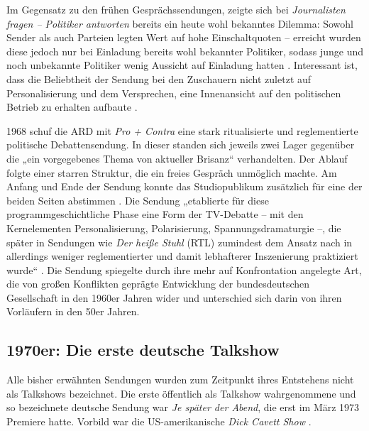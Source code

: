 Im Gegensatz zu den frühen Gesprächssendungen, zeigte sich bei \textit{Journalisten fragen – Politiker antworten} bereits ein heute wohl bekanntes Dilemma: Sowohl Sender als auch Parteien legten Wert auf hohe Einschaltquoten – erreicht wurden diese jedoch nur bei Einladung bereits wohl bekannter Politiker, sodass junge und noch unbekannte Politiker wenig Aussicht auf Einladung hatten \parencite[181]{kellerGeschichteTalkshowDeutschland2009}. Interessant ist, dass die Beliebtheit der Sendung bei den Zuschauern nicht zuletzt auf Personalisierung und dem Versprechen, eine Innenansicht auf den politischen Betrieb zu erhalten aufbaute \parencite[183]{kellerGeschichteTalkshowDeutschland2009}.

1968 schuf die ARD mit \textit{Pro + Contra} eine stark ritualisierte und reglementierte politische Debattensendung. In dieser standen sich jeweils zwei Lager gegenüber die „ein vorgegebenes Thema von aktueller Brisanz“ \parencite[169]{kellerGeschichteTalkshowDeutschland2009} verhandelten. Der Ablauf folgte einer starren Struktur, die ein freies Gespräch unmöglich machte. Am Anfang und Ende der Sendung konnte das Studiopublikum zusätzlich für eine der beiden Seiten abstimmen \parencite[169ff.]{kellerGeschichteTalkshowDeutschland2009}. Die Sendung „etablierte für diese programmgeschichtliche Phase eine Form der TV-Debatte – mit den Kernelementen Personalisierung, Polarisierung, Spannungsdramaturgie –, die später in Sendungen wie \textit{Der heiße Stuhl} (RTL) zumindest dem Ansatz nach in allerdings weniger reglementierter und damit lebhafterer Inszenierung praktiziert wurde“ \parencite[171]{kellerGeschichteTalkshowDeutschland2009}. Die Sendung spiegelte durch ihre mehr auf Konfrontation angelegte Art, die von großen Konflikten geprägte Entwicklung der bundesdeutschen Gesellschaft in den 1960er Jahren wider und unterschied sich darin von ihren Vorläufern in den 50er Jahren.

\subsection{1970er: Die erste deutsche Talkshow}

Alle bisher erwähnten Sendungen wurden zum Zeitpunkt ihres Entstehens nicht als Talkshows bezeichnet. Die erste öffentlich als Talkshow wahrgenommene und so bezeichnete deutsche Sendung war \textit{Je später der Abend}, die erst im März 1973 Premiere hatte. Vorbild war die US-amerikanische \textit{Dick Cavett Show} \parencite[226]{kellerGeschichteTalkshowDeutschland2009}.

